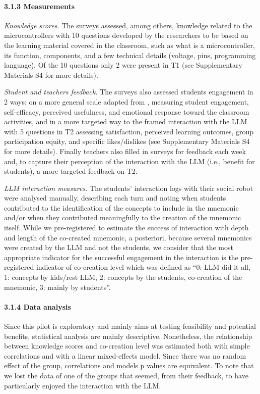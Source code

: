 \documentclass[fleqn,10pt]{wlscirep}
\begin{document}
\paragraph*{3.1.3 Measurements}

\textit{Knowledge scores.} The surveys assessed, among others, knowledge related to the microcontrollers with 10 questions developed by the researchers to be based on the learning material covered in the classroom, such as what is a microcontroller, its function, components, and a few technical details (voltage, pins, programming language). Of the 10 questions only 2 were present in T1 (see Supplementary Materials S4 for more details).

\textit{Student and teachers feedback.} The surveys also assessed students engagement in 2 ways: on a more general scale adapted from \cite{Heindl2020}, measuring student engagement, self-efficacy, perceived usefulness, and emotional response toward the classroom activities, and in a more targeted way to the framed interaction with the LLM with 5 questions in T2 assessing satisfaction, perceived learning outcomes, group participation equity, and specific likes/dislikes (see Supplementary Materials S4 for more details). Finally teachers also filled in surveys for feedback each week and, to capture their perception of the interaction with the LLM (i.e., benefit for students), a more targeted feedback on T2.

\textit{LLM interaction measures.} The students' interaction logs with their social robot were analysed manually, describing each turn and noting when students contributed to the identification of the concepts to include in the mnemonic and/or when they contributed meaningfully to the creation of the mnemonic itself. While we pre-registered to estimate the success of interaction with depth and length of the co-created mnemonic, a posteriori, because several mnemonics were created by the LLM and not the students, we consider that the most appropriate indicator for the successful engagement in the interaction is the pre-registered indicator of co-creation level which was defined as ``0: LLM did it all, 1: concepts by kids/rest LLM, 2: concepts by the students, co-creation of the mnemonic, 3: mainly by students''.

\paragraph*{3.1.4 Data analysis}

Since this pilot is exploratory and mainly aims at testing feasibility and potential benefits, statistical analysis are mainly descriptive. Nonetheless, the relationship between knowledge scores and co-creation level was estimated both with simple correlations and with a linear mixed-effects model. Since there was no random effect of the group, correlations and models p values are equivalent. To note that we lost the data of one of the groups that seemed, from their feedback, to have particularly enjoyed the interaction with the LLM.
\end{document}
